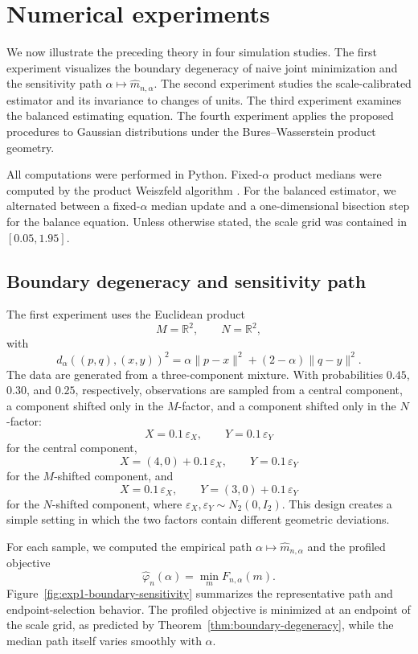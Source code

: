\documentclass[11pt]{article}
\newcommand{\1}{\mathbf{1}}
\begin{document}
\section{Numerical experiments}\label{sec:experiments}

We now illustrate the preceding theory in four simulation studies.  The first
experiment visualizes the boundary degeneracy of naive joint minimization and
the sensitivity path $\alpha\mapsto \widehat m_{n,\alpha}$.  The second
experiment studies the scale-calibrated estimator and its invariance to changes
of units.  The third experiment examines the balanced estimating equation.  The
fourth experiment applies the proposed procedures to Gaussian distributions
under the Bures--Wasserstein product geometry.

All computations were performed in Python.  Fixed-$\alpha$ product medians were
computed by the product Weiszfeld algorithm \citep{park_2026_GeometricMediansProduct}. 
For the balanced estimator, we alternated between a fixed-$\alpha$ median update
and a one-dimensional bisection step for the balance equation.  Unless otherwise
stated, the scale grid was contained in $[0.05,1.95]$.

\subsection{Boundary degeneracy and sensitivity path}

The first experiment uses the Euclidean product
\[
 M=\mathbb R^2,\qquad N=\mathbb R^2,
\]
with
\[
 d_\alpha((p,q),(x,y))^2
 =
 \alpha\|p-x\|^2+(2-\alpha)\|q-y\|^2 .
\]
The data are generated from a three-component mixture.  With probabilities
$0.45$, $0.30$, and $0.25$, respectively, observations are sampled from a
central component, a component shifted only in the $M$-factor, and a component
shifted only in the $N$-factor:
\[
 X=0.1\,\varepsilon_X,\qquad Y=0.1\,\varepsilon_Y
\]
for the central component,
\[
 X=(4,0)+0.1\,\varepsilon_X,\qquad Y=0.1\,\varepsilon_Y
\]
for the $M$-shifted component, and
\[
 X=0.1\,\varepsilon_X,\qquad Y=(3,0)+0.1\,\varepsilon_Y
\]
for the $N$-shifted component, where
$\varepsilon_X,\varepsilon_Y\sim N_2(0,I_2)$.  This design creates a simple
setting in which the two factors contain different geometric deviations.

For each sample, we computed the empirical path
$\alpha\mapsto \widehat m_{n,\alpha}$ and the profiled objective
\[
 \widehat\varphi_n(\alpha)
 =
 \min_m F_{n,\alpha}(m).
\]
Figure~\ref{fig:exp1-boundary-sensitivity} summarizes the representative path
and endpoint-selection behavior.  The profiled objective is minimized at an
endpoint of the scale grid, as predicted by Theorem~\ref{thm:boundary-degeneracy},
while the median path itself varies smoothly with $\alpha$.
\end{document}
